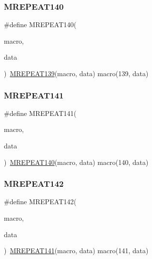 \mbox{\label{group__group__sam0__utils__mrepeat_ga040d95ace740614458cf565fe5cd29f4}} 
\subsubsection{\texorpdfstring{MREPEAT140}{MREPEAT140}}
{\footnotesize\ttfamily \#define M\+R\+E\+P\+E\+A\+T140(\begin{DoxyParamCaption}\item[{}]{macro,  }\item[{}]{data }\end{DoxyParamCaption})~\mbox{\hyperlink{group__group__sam0__utils__mrepeat_gaec99878cdc5458427287a040044924d3}{M\+R\+E\+P\+E\+A\+T139}}(macro, data)   macro(139, data)}

\mbox{\label{group__group__sam0__utils__mrepeat_gad51aaacf4994383b35e14ed4b6d6c4b0}} 
\subsubsection{\texorpdfstring{MREPEAT141}{MREPEAT141}}
{\footnotesize\ttfamily \#define M\+R\+E\+P\+E\+A\+T141(\begin{DoxyParamCaption}\item[{}]{macro,  }\item[{}]{data }\end{DoxyParamCaption})~\mbox{\hyperlink{group__group__sam0__utils__mrepeat_ga040d95ace740614458cf565fe5cd29f4}{M\+R\+E\+P\+E\+A\+T140}}(macro, data)   macro(140, data)}

\mbox{\label{group__group__sam0__utils__mrepeat_ga6177414b6882cdd46b50b679a3cfb927}} 
\subsubsection{\texorpdfstring{MREPEAT142}{MREPEAT142}}
{\footnotesize\ttfamily \#define M\+R\+E\+P\+E\+A\+T142(\begin{DoxyParamCaption}\item[{}]{macro,  }\item[{}]{data }\end{DoxyParamCaption})~\mbox{\hyperlink{group__group__sam0__utils__mrepeat_gad51aaacf4994383b35e14ed4b6d6c4b0}{M\+R\+E\+P\+E\+A\+T141}}(macro, data)   macro(141, data)}

